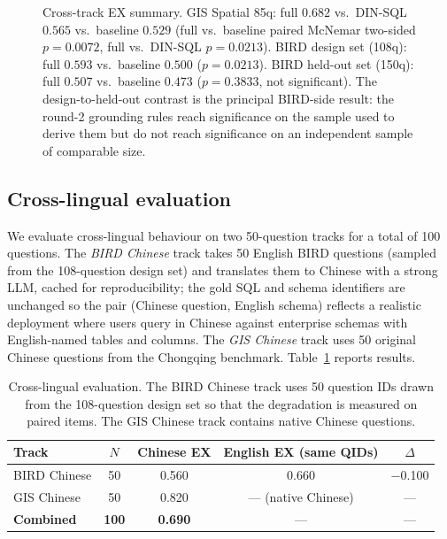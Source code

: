 \documentclass[11pt]{article}
\begin{document}
\begin{figure}[t]
\caption{Cross-track EX summary. GIS Spatial 85q: full $0.682$ vs.\ DIN-SQL $0.565$ vs.\ baseline $0.529$ (full vs.\ baseline paired McNemar two-sided $p=0.0072$, full vs.\ DIN-SQL $p=0.0213$). BIRD design set (108q): full $0.593$ vs.\ baseline $0.500$ ($p=0.0213$). BIRD held-out set (150q): full $0.507$ vs.\ baseline $0.473$ ($p=0.3833$, not significant). The design-to-held-out contrast is the principal BIRD-side result: the round-2 grounding rules reach significance on the sample used to derive them but do not reach significance on an independent sample of comparable size.}
\label{fig:cross}
\end{figure}

\subsection{Cross-lingual evaluation}
\label{sec:cross-lingual}

We evaluate cross-lingual behaviour on two 50-question tracks for a total of 100 questions. The \emph{BIRD Chinese} track takes 50 English BIRD questions (sampled from the 108-question design set) and translates them to Chinese with a strong LLM, cached for reproducibility; the gold SQL and schema identifiers are unchanged so the pair (Chinese question, English schema) reflects a realistic deployment where users query in Chinese against enterprise schemas with English-named tables and columns. The \emph{GIS Chinese} track uses 50 original Chinese questions from the Chongqing benchmark. Table~\ref{tab:crosslingual} reports results.

\begin{table}[t]
\centering
\caption{Cross-lingual evaluation. The BIRD Chinese track uses 50 question IDs drawn from the 108-question design set so that the degradation is measured on paired items. The GIS Chinese track contains native Chinese questions.}
\label{tab:crosslingual}
\begin{tabular}{lcccc}
\toprule
Track & $N$ & Chinese EX & English EX (same QIDs) & $\Delta$ \\
\midrule
BIRD Chinese  & 50  & 0.560 & 0.660 & $-$0.100 \\
GIS Chinese   & 50  & 0.820 & --- (native Chinese)    & --- \\
\midrule
\textbf{Combined} & \textbf{100} & \textbf{0.690} & --- & --- \\
\bottomrule
\end{tabular}
\end{table}
\end{document}
